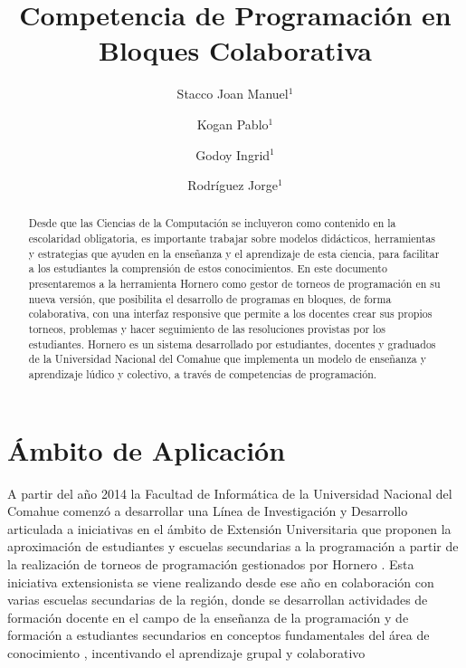 \documentclass{articleteyet}
\title{Competencia de Programación en Bloques Colaborativa}
\author{
  Stacco Joan Manuel$^{1}$ \and Kogan Pablo$^{1}$ \and Godoy Ingrid$^{1}$ \and    Rodríguez Jorge$^{1}$ }
\begin{document}
\balance
\maketitle


\begin{abstract}


Desde que las Ciencias de la Computación se incluyeron como contenido en la escolaridad obligatoria, es importante trabajar sobre modelos didácticos, herramientas y estrategias que ayuden en la enseñanza y el aprendizaje de esta ciencia, para facilitar a los estudiantes la comprensión de estos conocimientos. En este documento presentaremos a la herramienta Hornero como gestor de torneos de programación en su nueva versión, que posibilita el desarrollo de programas en bloques, de forma colaborativa, con una interfaz responsive que permite a los docentes crear sus propios torneos, problemas y hacer seguimiento de las resoluciones provistas por los estudiantes.
Hornero es un sistema desarrollado  por estudiantes, docentes y graduados de la Universidad Nacional del Comahue que implementa un modelo de enseñanza y aprendizaje lúdico y colectivo, a través de competencias de programación.  
  

 






\end{abstract}


\thispagestyle{empty}

\section{Ámbito de Aplicación}
\label{sec:AmbAplic} 
A partir del año 2014 la Facultad de Informática de la Universidad Nacional del Comahue comenzó a desarrollar una Línea de Investigación y Desarrollo articulada a iniciativas en el ámbito de Extensión Universitaria  que proponen la aproximación de estudiantes y escuelas secundarias a la programación a partir de la realización de torneos de programación gestionados por Hornero \cite{fracchia2016competir+}.  
Esta iniciativa extensionista se viene realizando desde ese año en colaboración con varias escuelas secundarias de la región, donde se desarrollan actividades de formación docente en el campo de la enseñanza de la programación y de formación a estudiantes secundarios en conceptos fundamentales del área de conocimiento \cite{PETP}, incentivando el aprendizaje grupal y colaborativo
\end{document}
